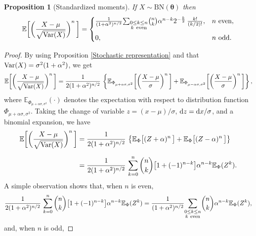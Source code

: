 \documentclass[12pt]{article}
\newtheorem{proposition}[theorem]{Proposition}
\theoremstyle{definition}
\begin{document}
\begin{proposition}[Standardized moments]
If $X\sim \text{BN}(\boldsymbol{\theta})$ then 
\begin{align*}
\mathbb{E}\biggl[\biggl({X-\mu\over\sqrt{{\rm Var}(X)}}\biggr)^n\,\biggr]=
\begin{cases}
{1\over (1+\alpha^2)^{n/2}}
{\sum_{\substack{0\leq k\leq n\\ k\ {\rm even}}}} \binom{n}{k} \alpha^{n-k}
2^{-{k\over 2}}\, {k!\over (k/2)!}, &  n \ \text{even},
\\[0,35cm]
0, & n \ \text{odd}.
\end{cases}
\end{align*}
\end{proposition}
\begin{proof}
By using Proposition \ref{Stochastic representation} and that ${\rm Var}(X)=\sigma^2(1+\alpha^2)$, we get
\begin{align*}
\mathbb{E}\biggl[\biggl({X-\mu\over\sqrt{{\rm Var}(X)}}\biggr)^n\,\biggr]
=
{1\over 2(1+\alpha^2)^{n/2}}\, 
\left\{
\mathbb{E}_{\Phi_{\mu+\alpha\sigma, \sigma^2 }}\biggl[\biggl({X-\mu\over\sigma}\biggr)^n\,\biggr]
+
\mathbb{E}_{\Phi_{\mu-\alpha\sigma, \sigma^2 }}\biggl[\biggl({X-\mu\over\sigma}\biggr)^n\,\biggr]
\right\},
\end{align*}
where $\mathbb{E}_{\Phi_{\mu+\alpha\sigma, \sigma^2 }}(\cdot)$ denotes the expectation with respect to distribution function $\Phi_{\mu+\alpha\sigma, \sigma^2 }$.
Taking the change of variable $z=(x-\mu)/\sigma$, ${\rm d}z={\rm d}x/\sigma$, and a binomial expansion, we have
\begin{align} \label{id-1}
\mathbb{E}\biggl[\biggl({X-\mu\over\sqrt{{\rm Var}(X)}}\biggr)^n\,\biggr]
&=
{1\over 2 (1+\alpha^2)^{n/2}}\, 
\left\{
\mathbb{E}_{\Phi}\big[(Z+\alpha)^n\,\big]
+
\mathbb{E}_{\Phi}\big[(Z-\alpha)^n\,\big]
\right\} \nonumber
\\[0,2cm]
&=
{1\over 2(1+\alpha^2)^{n/2}}\, 
\sum_{k=0}^{n}\binom{n}{k} \big[1+(-1)^{n-k}\big] \alpha^{n-k}
\mathbb{E}_{\Phi}(Z^k).
\end{align}
A simple observation shows that, when $n$ is even,
\begin{align} \label{id-2}
{1\over 2(1+\alpha^2)^{n/2}}\, 
\sum_{k=0}^{n}\binom{n}{k} \big[1+(-1)^{n-k}\big] \alpha^{n-k}
\mathbb{E}_{\Phi}(Z^k)
=
{1\over (1+\alpha^2)^{n/2}}
{\sum_{\substack{0\leq k\leq n\\ k\ {\rm even}}}} \binom{n}{k} \alpha^{n-k} \mathbb{E}_{\Phi}(Z^k),
\end{align}
and, when $n$ is odd,

\end{proof}
\end{document}
